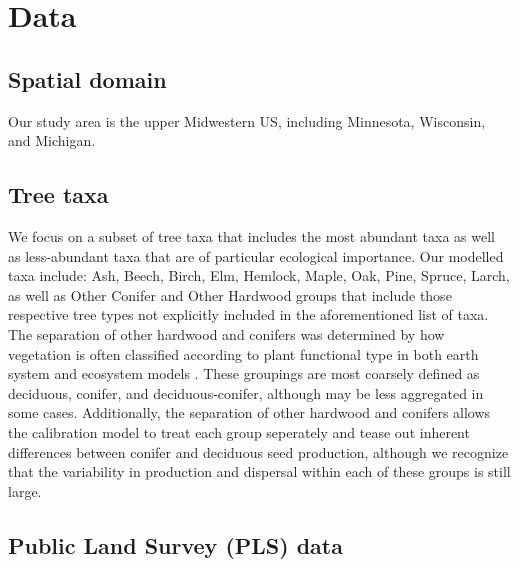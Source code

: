 \documentclass[12pt]{article}
\begin{document}
\section{Data}

\subsection{Spatial domain}
Our study area is the upper Midwestern US, including Minnesota,
Wisconsin, and Michigan. 

\subsection{Tree taxa}
We focus on a subset of tree taxa that includes the most abundant taxa
as well as less-abundant taxa that are of particular ecological
importance. Our modelled taxa include: Ash, Beech, Birch, Elm,
Hemlock, Maple, Oak, Pine, Spruce, Larch, as well as Other Conifer and
Other Hardwood groups that include those respective tree types not
explicitly included in the aforementioned list of taxa. The separation
of other hardwood and conifers was determined by how vegetation is
often classified according to plant functional type in both earth
system and ecosystem models \citep{cramer2001global, goring}. These
groupings are most coarsely defined as deciduous, conifer, and
deciduous-conifer, although may be less aggregated in some
cases. Additionally, the separation of other hardwood and conifers
allows the calibration model to treat each group seperately and tease
out inherent differences between conifer and deciduous seed
production, although we recognize that the variability in production
and dispersal within each of these groups is still large.


\subsection{Public Land Survey (PLS) data}
\end{document}
